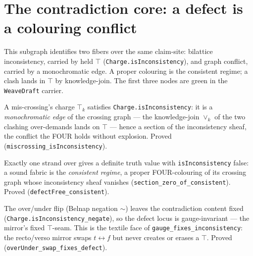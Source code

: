 \section{The contradiction core: a defect is a colouring conflict}

This subgraph identifies two fibers over the same claim-site: bilattice
inconsistency, carried by held $\top$ (\texttt{Charge.isInconsistency}), and
graph conflict, carried by a monochromatic edge.  A proper colouring is the
consistent regime; a clash lands in $\top$ by knowledge-join.  The first three
nodes are green in the \texttt{WeaveDraft} carrier.

\begin{theorem}\label{thm:miscrossing-inconsistency}\leanok{}
A mis-crossing's charge $\top_k$ satisfies \texttt{Charge.isInconsistency}: it is a
\emph{monochromatic edge} of the crossing graph --- the knowledge-join $\vee_k$ of the two
clashing over-demands lands on $\top$ --- hence a section of the inconsistency sheaf, the
conflict the FOUR holds without explosion. Proved (\texttt{miscrossing\_isInconsistency}).
\end{theorem}

\begin{theorem}\label{thm:defectfree-consistent}\leanok{}
Exactly one strand over gives a definite truth value with \texttt{isInconsistency} false: a
sound fabric is the \emph{consistent regime}, a proper FOUR-colouring of its crossing graph
whose inconsistency sheaf vanishes (\texttt{section\_zero\_of\_consistent}). Proved
(\texttt{defectFree\_consistent}).
\end{theorem}

\begin{theorem}\label{thm:mirror-is-gauge}\leanok{}
The over/under flip (Belnap negation $\sim$) leaves the contradiction content fixed
(\texttt{Charge.isInconsistency\_negate}), so the defect locus is gauge-invariant --- the
mirror's fixed $\top$-seam. This is the textile face of \texttt{gauge\_fixes\_inconsistency}:
the recto/verso mirror swaps $t \leftrightarrow f$ but never creates or erases a $\top$.
Proved (\texttt{overUnder\_swap\_fixes\_defect}).
\end{theorem}

